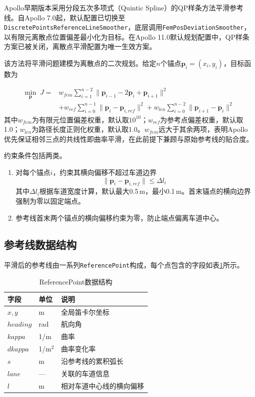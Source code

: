 Apollo早期版本采用分段五次多项式（Quintic Spline）的QP样条方法平滑参考线。自Apollo 7.0起，默认配置已切换至\texttt{DiscretePointsReferenceLineSmoother}，底层调用\texttt{FemPosDeviationSmoother}，以有限元离散点位置偏差最小化为目标。在Apollo 11.0默认规划配置中，QP样条方案已被关闭，离散点平滑配置为唯一生效方案。

该方法将平滑问题建模为离散点的二次规划。给定$n$个锚点$\mathbf{p}_i = (x_i, y_i)$，目标函数为

\begin{equation}
\begin{aligned}
\min_{\mathbf{p}} \; J ={}& w_{fem} \sum_{i=1}^{n-2} \|\mathbf{p}_{i-1} - 2\mathbf{p}_i + \mathbf{p}_{i+1}\|^2 \\
&+ w_{ref} \sum_{i=0}^{n-1} \|\mathbf{p}_i - \mathbf{p}_{i,ref}\|^2 + w_{len} \sum_{i=0}^{n-2} \|\mathbf{p}_{i+1} - \mathbf{p}_i\|^2
\end{aligned}
\label{eq:refline_obj}
\end{equation}
其中$w_{fem}$为有限元位置偏差权重，默认取$10^{10}$；$w_{ref}$为参考点偏差权重，默认取1.0；$w_{len}$为路径长度正则化权重，默认取1.0。$w_{fem}$远大于其余两项，表明Apollo优先保证相邻三点的共线性即曲率平滑，在此前提下兼顾与原始参考线的贴合度。

约束条件包括两类。
\begin{enumerate}
\item 对每个锚点$i$，约束其横向偏移不超过车道边界
\begin{equation}
\|\mathbf{p}_i - \mathbf{p}_{i,ref}\| \leq \Delta l_i
\end{equation}
其中$\Delta l_i$根据车道宽度计算，默认最大0.5\,m，最小0.1\,m。首末锚点的横向边界强制为零以固定端点。

\item 参考线首末两个锚点的横向偏移约束为零，防止端点偏离车道中心。
\end{enumerate}

\subsection{参考线数据结构}

平滑后的参考线由一系列\texttt{ReferencePoint}构成，每个点包含的字段如表\ref{tab:refpoint}所示。

\begin{table}[htbp]
\centering
\caption{ReferencePoint数据结构}
\label{tab:refpoint}
\begin{tabular}{lll}
\toprule
字段 & \textbf{单位} & \textbf{说明} \\
\midrule
$x, y$ & m & 全局笛卡尔坐标 \\
$heading$ & rad & 航向角 \\
$kappa$ & 1/m & 曲率 \\
$dkappa$ & 1/m$^2$ & 曲率变化率 \\
$s$ & m & 沿参考线的累积弧长 \\
$lane$ & — & 关联的车道信息 \\
$l$ & m & 相对车道中心线的横向偏移 \\
\bottomrule
\end{tabular}
\end{table}

